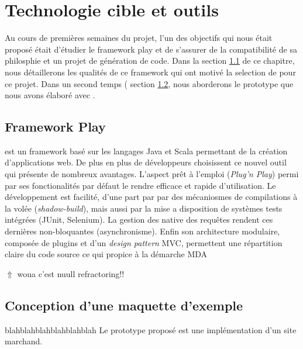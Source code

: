 \chapter{Technologie cible et outils}\label{chap:met}
Au cours de premières semaines du projet, l'un des objectifs qui nous était proposé était d'étudier le framework play et de s'assurer de la compatibilité de sa philosphie et un projet de génération de code. Dans la section \ref{sec:pla} de ce chapitre, nous détaillerons les qualités de ce framework qui ont motivé la selection de \play{} pour ce projet. Dans un second temps (\cf{} section \ref{sec:pro}, nous aborderons le prototype que nous avons élaboré avec \play. 


\section{Framework Play}\label{sec:pla}
\play{} est un framework basé sur les langages Java et Scala permettant de la création d'applications web. De plus en plus de développeurs choisissent ce nouvel outil qui présente de nombreux avantages. L'aspect \og prêt à l'emploi \fg{} (\textit{Plug'n Play}) permi par ses fonctionalités par défaut le rendre efficace et rapide d'utilisation. Le développement est facilité, d'une part par par des mécaniosmes de compilations à la volée (\textit{shadow-build}), mais aussi par la mise a disposition de systèmes tests intégrées (JUnit, Selenium). La gestion des native des requêtes rendent ces dernières non-bloquantes (asynchronisme). Enfin son architecture modulaire, composée de plugins et d'un \textit{design pattern} MVC, permettent une répartition claire du code source ce qui propice à la démarche MDA

{\huge $\Uparrow$ woua c'est nuull refractoring!!}



\section{Conception d’une maquette d’exemple}\label{sec:pro}

blahblahblahblahblahblah
Le prototype proposé est une implémentation d'un site marchand. 





